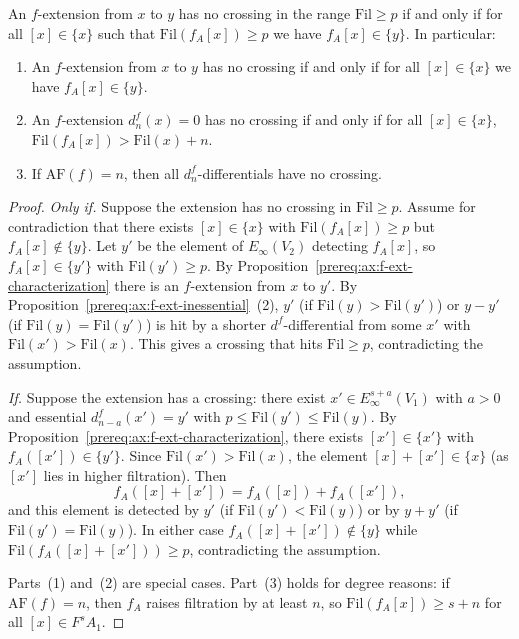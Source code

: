 \begin{axiom}\label{prereq:ax:no-crossing-iff}
    \notready
    An $f$-extension from $x$ to $y$ has no crossing in the range $\mathrm{Fil} \ge p$ if and only if for all $[x] \in \{x\}$ such that $\mathrm{Fil}(f_A[x]) \ge p$ we have $f_A[x] \in \{y\}$. In particular:
    \begin{enumerate}
        \item An $f$-extension from $x$ to $y$ has no crossing if and only if for all $[x] \in \{x\}$ we have $f_A[x] \in \{y\}$.
        \item An $f$-extension $d_n^f(x) = 0$ has no crossing if and only if for all $[x] \in \{x\}$, $\mathrm{Fil}(f_A[x]) > \mathrm{Fil}(x) + n$.
        \item If $\mathrm{AF}(f) = n$, then all $d_n^f$-differentials have no crossing.
    \end{enumerate}
\end{axiom}
\begin{proof}\leanok
    \emph{Only if.} Suppose the extension has no crossing in $\mathrm{Fil} \ge p$. Assume for contradiction that there exists $[x] \in \{x\}$ with $\mathrm{Fil}(f_A[x]) \ge p$ but $f_A[x] \notin \{y\}$. Let $y'$ be the element of $E_\infty(V_2)$ detecting $f_A[x]$, so $f_A[x] \in \{y'\}$ with $\mathrm{Fil}(y') \ge p$. By Proposition~\ref{prereq:ax:f-ext-characterization} there is an $f$-extension from $x$ to $y'$. By Proposition~\ref{prereq:ax:f-ext-inessential}~(2), $y'$ (if $\mathrm{Fil}(y) > \mathrm{Fil}(y')$) or $y - y'$ (if $\mathrm{Fil}(y) = \mathrm{Fil}(y')$) is hit by a shorter $d^f$-differential from some $x'$ with $\mathrm{Fil}(x') > \mathrm{Fil}(x)$. This gives a crossing that hits $\mathrm{Fil} \ge p$, contradicting the assumption.

    \emph{If.} Suppose the extension has a crossing: there exist $x' \in E_\infty^{s+a}(V_1)$ with $a > 0$ and essential $d_{n-a}^f(x') = y'$ with $p \le \mathrm{Fil}(y') \le \mathrm{Fil}(y)$. By Proposition~\ref{prereq:ax:f-ext-characterization}, there exists $[x'] \in \{x'\}$ with $f_A([x']) \in \{y'\}$. Since $\mathrm{Fil}(x') > \mathrm{Fil}(x)$, the element $[x] + [x'] \in \{x\}$ (as $[x']$ lies in higher filtration). Then
    $$f_A([x] + [x']) = f_A([x]) + f_A([x']),$$
    and this element is detected by $y'$ (if $\mathrm{Fil}(y') < \mathrm{Fil}(y)$) or by $y + y'$ (if $\mathrm{Fil}(y') = \mathrm{Fil}(y)$). In either case $f_A([x] + [x']) \notin \{y\}$ while $\mathrm{Fil}(f_A([x] + [x'])) \ge p$, contradicting the assumption.

    Parts~(1) and~(2) are special cases. Part~(3) holds for degree reasons: if $\mathrm{AF}(f) = n$, then $f_A$ raises filtration by at least $n$, so $\mathrm{Fil}(f_A[x]) \ge s + n$ for all $[x] \in F^s A_1$.
\end{proof}

